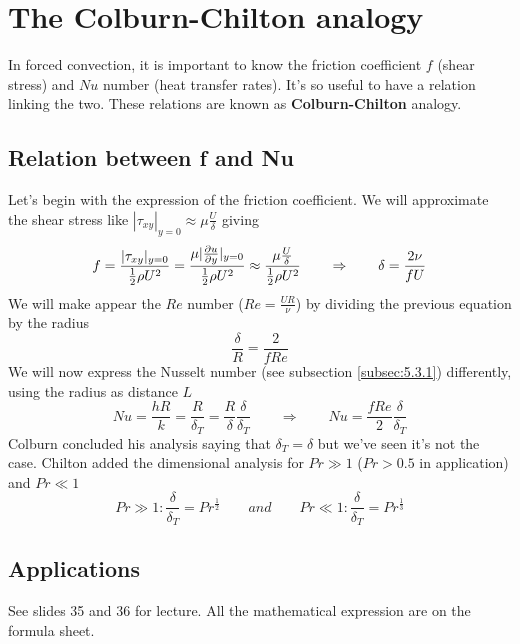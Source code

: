\section{The Colburn-Chilton analogy}
	In forced convection, it is important to know the friction coefficient $f$ (shear stress) and $Nu$ number (heat transfer rates). It's so useful to have a relation linking the two. These relations are known as \textbf{Colburn-Chilton} analogy. 
	
	\subsection{Relation between f and Nu}
	Let's begin with the expression of the friction coefficient. We will approximate the shear stress like $|\tau _{xy}|_{y=0} \approx \mu\frac{U}{\delta}$ giving
	\begin{equation}
		f = \frac{|\tau _{xy}|_{y=0}}{\frac{1}{2}\rho U^2} = \frac{\mu |\frac{\partial u}{\partial y}|_{y=0}}{\frac{1}{2}\rho U^2} \approx \frac{\mu \frac{U}{\delta}}{\frac{1}{2}\rho U^2} \qquad \Rightarrow \qquad \delta = \frac{2\nu}{fU}
	\end{equation}
	We will make appear the $Re$ number ($Re = \frac{UR}{\nu}$) by dividing the previous equation by the radius
	\begin{equation}
		\frac{\delta}{R} = \frac{2}{fRe}
	\end{equation}
	We will now express the Nusselt number (see subsection \ref{subsec:5.3.1}) differently, using the radius as distance $L$
	\begin{equation}
		Nu = \frac{hR}{k} = \frac{R}{\delta _T} = \frac{R}{\delta}\frac{\delta}{\delta _T} \qquad \Rightarrow \qquad Nu = \frac{fRe}{2}\frac{\delta}{\delta _T}
	\end{equation}
	Colburn concluded his analysis saying that $\delta _T = \delta$ but we've seen it's not the case. Chilton added the dimensional analysis for $Pr \gg 1$ ($Pr > 0.5$ in application) and $Pr \ll 1$
	\begin{equation}
		Pr \gg 1 : \frac{\delta }{\delta _T} = Pr ^{\frac{1}{2}} \qquad and \qquad Pr \ll 1 : \frac{\delta}{\delta _T} = Pr ^{\frac{1}{3}}
	\end{equation}

\subsection{Applications}
	See slides 35 and 36 for lecture. All the mathematical expression are on the formula sheet. 
	
